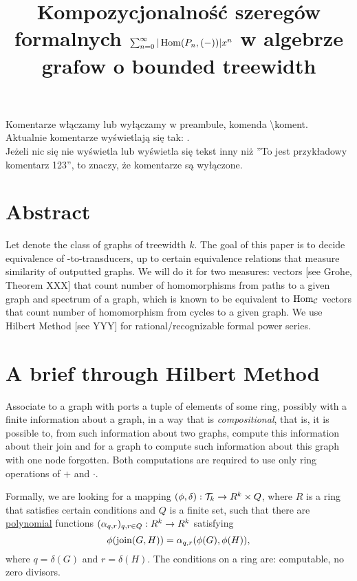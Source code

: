 
\title{Kompozycjonalność szeregów formalnych $\sum_{n=0}^{\infty}  | \operatorname{Hom}(P_n, (-)) | x^n$ w algebrze grafow o bounded treewidth}

	\maketitle
\noindent Komentarze włączamy lub wyłączamy w preambule, komenda \textbackslash koment.\\
Aktualnie komentarze wyświetlają się tak: .\\
Jeżeli nic się nie wyświetla lub wyświetla się tekst inny niż ''To jest przykładowy komentarz 123'', to znaczy, że komentarze są wyłączone.\\
\section{Abstract}
Let \twk denote the class of graphs of treewidth $k$.
The goal of this paper is to decide equivalence of \twk-to-\twk transducers, up to certain equivalence relations that measure similarity of outputted graphs. We will do it for two measures: \HomP vectors [see Grohe, Theorem XXX] that count number of homomorphisms from paths to a given graph and spectrum of a graph, which is known to be equivalent to $\operatorname{Hom}_{\mathcal{C}}$ vectors that count number of homomorphism from cycles to a given graph. We use Hilbert Method [see YYY] for rational/recognizable formal power series.

\section{A brief through Hilbert Method}
Associate to a graph with ports a tuple of elements of some ring, possibly with a finite information about a graph, in a way that is \emph{compositional}, that is, it is possible to, from such information about two graphs, compute this information about their join and for a graph to compute such information about this graph with one node forgotten. Both computations are required to use only ring operations of $+$ and $\cdot$.

Formally, we are looking for a mapping $(\phi, \delta):\mathcal{T}_{k}\rightarrow R^k \times Q$, where $R$ is a ring that satisfies certain conditions and $Q$ is a finite set, such that there are \underline{polynomial} functions $(\alpha_{q,r})_{q, r \in Q}:R^k\rightarrow R^k$ satisfying
$$
	\phi(\mathrm{join}(G, H)) = \alpha_{q, r}(\phi(G), \phi(H)),
$$
where $q = \delta(G)$ and $r = \delta(H)$. The conditions on a ring are: computable, no zero divisors.
